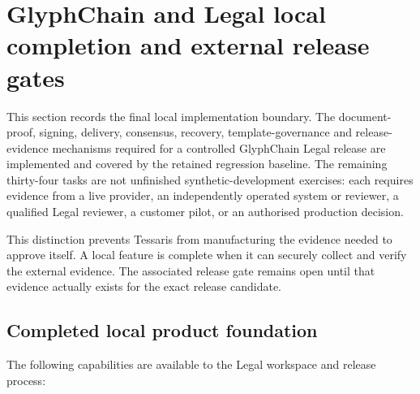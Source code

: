 \section{GlyphChain and Legal local completion and external release gates}
\label{sec:glyphchain-local-completion-external-gates}

This section records the final local implementation boundary.  The document-proof,
signing, delivery, consensus, recovery, template-governance and release-evidence
mechanisms required for a controlled GlyphChain Legal release are implemented and
covered by the retained regression baseline.  The remaining thirty-four tasks are
not unfinished synthetic-development exercises: each requires evidence from a live
provider, an independently operated system or reviewer, a qualified Legal reviewer,
a customer pilot, or an authorised production decision.

This distinction prevents Tessaris from manufacturing the evidence needed to
approve itself.  A local feature is complete when it can securely collect and
verify the external evidence.  The associated release gate remains open until that
evidence actually exists for the exact release candidate.

\subsection{Completed local product foundation}

The following capabilities are available to the Legal workspace and release
process:

